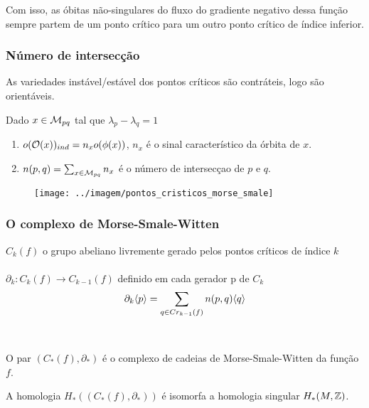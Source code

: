 \documentclass{beamer}
\begin{document}
\begin{footnotesize}
\begin{frame}
		Com isso, as óbitas não-singulares do fluxo do gradiente negativo dessa função sempre partem de um ponto crítico para um outro ponto crítico de índice inferior.

				
	\end{frame}
	
	\begin{frame}
		\frametitle{Número de intersecção}
		As variedades instável/estável dos pontos críticos são contráteis, logo são orientáveis.
		
		\begin{definicao}
			Dado $x \in \mathcal{M}_{pq}$ tal que $\lambda_{p}-\lambda_{q} = 1$
			
			\begin{enumerate}
				\item $o(\mathcal{O}(x))_{ind} = n_{x}o(\phi(x))$, $n_{x}$ é o sinal característico da órbita de $x$.
				
				\item $n(p,q) = \sum_{x \in \mathcal{M}_{pq} }n_{x}$ é o número de intersecçao de $p$ e $q$.
			\end{enumerate}
			
		\end{definicao}
		\begin{figure}
			\centering
			\textbf{}\par
			\texttt{[image: ../imagem/pontos\_cristicos\_morse\_smale]}
		\end{figure}
	\end{frame}
	
	\begin{frame}
		\frametitle{O complexo de Morse-Smale-Witten}
		\begin{definicao}
			$C_{k}(f)$ o grupo abeliano livremente gerado pelos pontos críticos de índice $k$ 
			\\~\\
			$\partial_{k}: C_{k}(f)\to C_{k-1}(f)$ definido em cada gerador p de $C_{k}$
			$$
			\partial_{k}\langle p\rangle=\sum_{q \in Cr_{k-1}(f)}n(p,q)\langle q\rangle
			$$
			\\~\\
			O par $(C_{*}(f), \partial_{*})$ é o complexo de cadeias de Morse-Smale-Witten  da função $f$.
		\end{definicao}
		
		
		\begin{teorema}
			 A homologia $H_{*}((C_{*}(f), \partial_{*})) $ é isomorfa a homologia singular $H_{*}(M, \mathbb{Z})$.
		\end{teorema}
	\end{frame}
	

\end{footnotesize}
\end{document}
